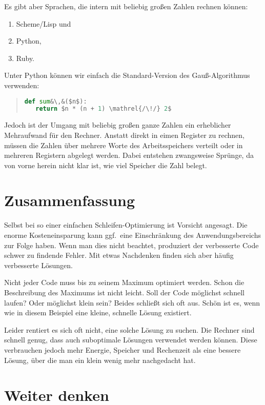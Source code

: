 \documentclass[a5paper,landscape,ngerman,10pt]{article}
\begin{document}
Es gibt aber Sprachen, die intern mit beliebig großen
Zahlen rechnen können:

\begin{enumerate}
 \item Scheme/Lisp und
 \item Python,
 \item Ruby.
\end{enumerate}

Unter Python können wir einfach die Standard-Version
des Gauß-Algorithmus verwenden:

\begin{quotation}
\begin{lstlisting}[language=Python]
def sum&\,&($n$):
   return $n * (n + 1) \mathrel{/\!/} 2$
\end{lstlisting}
\end{quotation}

Jedoch ist der Umgang mit beliebig großen ganze Zahlen
ein erheblicher Mehraufwand für den Rechner.
Anstatt direkt in eimen Register zu rechnen, müssen die
Zahlen über mehrere Worte des Arbeitsspeichers verteilt
oder in mehreren Registern abgelegt werden.
Dabei entstehen zwangsweise Sprünge, da von vorne herein
nicht klar ist, wie viel Speicher die Zahl belegt.

\section{Zusammenfassung}

Selbst bei so einer einfachen Schleifen-Optimierung ist
Vorsicht angesagt.
Die enorme Kosteneinsparung kann ggf.\ eine Einschränkung
des Anwendungsbereichs zur Folge haben.
Wenn man dies nicht beachtet, produziert der verbesserte
Code schwer zu findende Fehler.
Mit etwas Nachdenken finden sich aber häufig verbesserte
Lösungen.

Nicht jeder Code muss bis zu seinem Maximum optimiert
werden.
Schon die Beschreibung des Maximums ist nicht leicht.
Soll der Code möglichst schnell laufen?
Oder möglichst klein sein?
Beides schließt sich oft aus.
Schön ist es, wenn wie in diesem Beispiel eine kleine,
schnelle Lösung existiert.

Leider rentiert es sich oft nicht, eine solche Lösung
zu suchen.
Die Rechner sind schnell genug, dass auch suboptimale
Lösungen verwendet werden können.
Diese verbrauchen jedoch mehr Energie, Speicher und
Rechenzeit als eine bessere Lösung, über die man ein
klein wenig mehr nachgedacht hat.

\section{Weiter denken}
\end{document}
